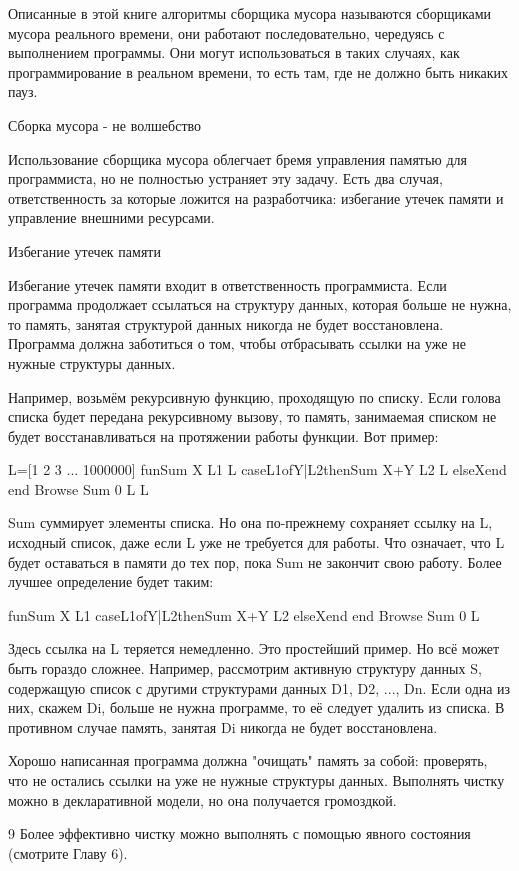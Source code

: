 Описанные в этой книге алгоритмы сборщика мусора называются сборщиками мусора реального времени, они работают последовательно, чередуясь с выполнением программы. Они могут использоваться в таких случаях, как программирование в реальном времени, то есть там, где не должно быть никаких пауз.

Сборка мусора - не волшебство

Использование сборщика мусора облегчает бремя управления памятью для программиста, но не полностью устраняет эту задачу. Есть два случая, ответственность за которые ложится на разработчика: избегание утечек памяти и управление внешними ресурсами.

Избегание утечек памяти

Избегание утечек памяти входит в ответственность программиста. Если программа продолжает ссылаться на структуру данных, которая больше не нужна, то память, занятая структурой данных никогда не будет восстановлена. Программа должна заботиться о том, чтобы отбрасывать ссылки на уже не нужные структуры данных.

Например, возьмём рекурсивную функцию, проходящую по списку. Если голова списка будет передана рекурсивному вызову, то память, занимаемая списком не будет восстанавливаться на протяжении работы функции. Вот пример:

L=[1 2 3 ... 1000000]
fun{Sum X L1 L}
caseL1ofY|L2then{Sum X+Y L2 L}
elseXend
end
{Browse {Sum 0 L L}}

Sum суммирует элементы списка. Но она по-прежнему сохраняет ссылку на L, исходный список, даже если L уже не требуется для работы. Что означает, что L будет оставаться в памяти до тех пор, пока Sum не закончит свою работу. Более лучшее определение будет таким:

fun{Sum X L1}
caseL1ofY|L2then{Sum X+Y L2}
elseXend
end
{Browse {Sum 0 L}}

Здесь ссылка на L теряется немедленно. Это простейший пример. Но всё может быть гораздо сложнее. Например, рассмотрим активную структуру данных S, содержащую список с другими структурами данных D1, D2, ..., Dn. Если одна из них, скажем Di, больше не нужна программе, то её следует удалить из списка. В противном случае память, занятая Di никогда не будет восстановлена.

Хорошо написанная программа должна "очищать" память за собой: проверять, что не остались ссылки на уже не нужные структуры данных. Выполнять чистку можно в декларативной модели, но она получается громоздкой.

9 Более эффективно чистку можно выполнять с помощью явного состояния (смотрите Главу 6).

